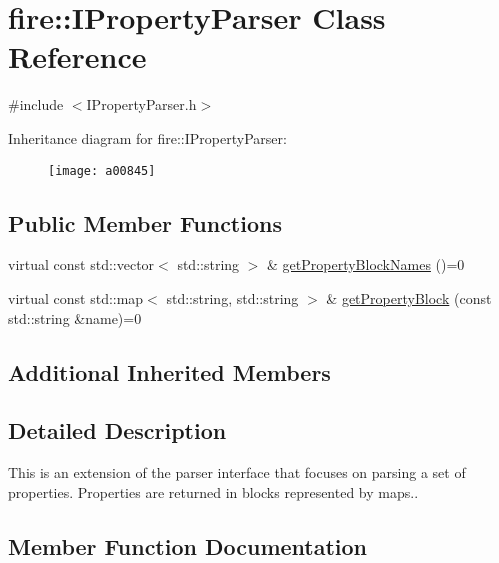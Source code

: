 \hypertarget{a00845}{}\section{fire\+:\+:I\+Property\+Parser Class Reference}
\label{a00845}


{\ttfamily \#include $<$I\+Property\+Parser.\+h$>$}

Inheritance diagram for fire\+:\+:I\+Property\+Parser\+:\begin{figure}[H]
\begin{center}
\leavevmode
\texttt{[image: a00845]}
\end{center}
\end{figure}
\subsection*{Public Member Functions}
\begin{DoxyCompactItemize}
\item 
virtual const std\+::vector$<$ std\+::string $>$ \& \hyperlink{a00845_a34602687f9d1affac7bd842102d4a6aa}{get\+Property\+Block\+Names} ()=0
\item 
virtual const std\+::map$<$ std\+::string, std\+::string $>$ \& \hyperlink{a00845_a34201371cb36dd09e96a66242ececb86}{get\+Property\+Block} (const std\+::string \&name)=0
\end{DoxyCompactItemize}
\subsection*{Additional Inherited Members}


\subsection{Detailed Description}
This is an extension of the parser interface that focuses on parsing a set of properties. Properties are returned in blocks represented by maps.. 

\subsection{Member Function Documentation}
\mbox{\label{a00845_a34201371cb36dd09e96a66242ececb86}} 
